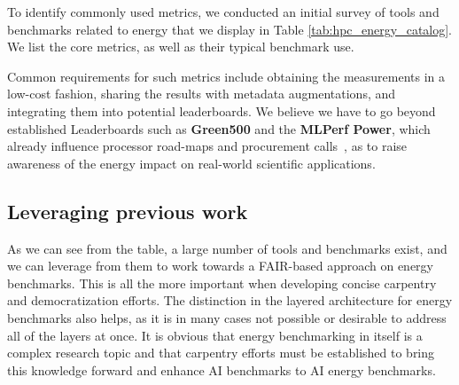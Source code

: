 To identify commonly used metrics, we conducted an initial survey of tools and benchmarks related to energy that we display in Table \ref{tab:hpc_energy_catalog}.
We list the core metrics, as well as their typical benchmark use.

Common requirements for such metrics include obtaining the measurements in a low-cost fashion, sharing the results with metadata augmentations, and integrating them into potential leaderboards. 
We believe we have to go beyond established Leaderboards such as \textbf{Green500} and the \textbf{MLPerf Power}, which already influence processor road-maps and procurement calls~\cite{Scogland11Green500,Tschand24MLPerfPower}, as to raise awareness of the energy impact on real-world scientific applications.

\subsection{Leveraging previous work}

As we can see from the table, a large number of tools and benchmarks exist, and we can leverage from them to work towards a FAIR-based approach on energy benchmarks. This is all the more important when developing concise carpentry and democratization efforts. The distinction in the layered architecture for energy benchmarks also helps, as it is in many cases not possible or desirable to address all of the layers at once. It is obvious that energy benchmarking in itself is a complex research topic and that carpentry efforts must be established to bring this knowledge forward and enhance AI benchmarks to AI energy benchmarks.

